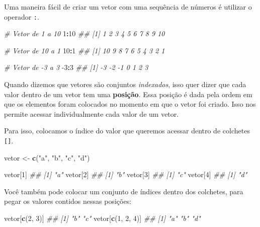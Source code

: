 \documentclass[]{book}
\newenvironment{Shaded}{\begin{snugshade}}{\end{snugshade}}
\newcommand{\CommentTok}[1]{\textcolor[rgb]{0.56,0.35,0.01}{\textit{#1}}}
\newcommand{\DecValTok}[1]{\textcolor[rgb]{0.00,0.00,0.81}{#1}}
\newcommand{\KeywordTok}[1]{\textcolor[rgb]{0.13,0.29,0.53}{\textbf{#1}}}
\newcommand{\NormalTok}[1]{#1}
\newcommand{\OperatorTok}[1]{\textcolor[rgb]{0.81,0.36,0.00}{\textbf{#1}}}
\newcommand{\StringTok}[1]{\textcolor[rgb]{0.31,0.60,0.02}{#1}}
\begin{document}
Uma maneira fácil de criar um vetor com uma sequência de números é utilizar o operador \texttt{:}.

\begin{Shaded}
\begin{Highlighting}[]
\CommentTok{# Vetor de 1 a 10}
\DecValTok{1}\OperatorTok{:}\DecValTok{10}
\CommentTok{##  [1]  1  2  3  4  5  6  7  8  9 10}

\CommentTok{# Vetor de 10 a 1}
\DecValTok{10}\OperatorTok{:}\DecValTok{1}
\CommentTok{##  [1] 10  9  8  7  6  5  4  3  2  1}

\CommentTok{# Vetor de -3 a 3}
\DecValTok{-3}\OperatorTok{:}\DecValTok{3}
\CommentTok{## [1] -3 -2 -1  0  1  2  3}
\end{Highlighting}
\end{Shaded}

Quando dizemos que vetores são conjuntos \emph{indexados}, isso quer dizer que cada valor dentro de um vetor tem uma \textbf{posição}. Essa posição é dada pela ordem em que os elementos foram colocados no momento em que o vetor foi criado. Isso nos permite acessar individualmente cada valor de um vetor.

Para isso, colocamos o índice do valor que queremos acessar dentro de colchetes \texttt{{[}{]}}.

\begin{Shaded}
\begin{Highlighting}[]
\NormalTok{vetor <-}\StringTok{ }\KeywordTok{c}\NormalTok{(}\StringTok{"a"}\NormalTok{, }\StringTok{"b"}\NormalTok{, }\StringTok{"c"}\NormalTok{, }\StringTok{"d"}\NormalTok{)}

\NormalTok{vetor[}\DecValTok{1}\NormalTok{]}
\CommentTok{## [1] "a"}
\NormalTok{vetor[}\DecValTok{2}\NormalTok{]}
\CommentTok{## [1] "b"}
\NormalTok{vetor[}\DecValTok{3}\NormalTok{]}
\CommentTok{## [1] "c"}
\NormalTok{vetor[}\DecValTok{4}\NormalTok{]}
\CommentTok{## [1] "d"}
\end{Highlighting}
\end{Shaded}

Você também pode colocar um conjunto de índices dentro dos colchetes, para pegar os valores contidos nessas posições:

\begin{Shaded}
\begin{Highlighting}[]
\NormalTok{vetor[}\KeywordTok{c}\NormalTok{(}\DecValTok{2}\NormalTok{, }\DecValTok{3}\NormalTok{)]}
\CommentTok{## [1] "b" "c"}
\NormalTok{vetor[}\KeywordTok{c}\NormalTok{(}\DecValTok{1}\NormalTok{, }\DecValTok{2}\NormalTok{, }\DecValTok{4}\NormalTok{)]}
\CommentTok{## [1] "a" "b" "d"}
\end{Highlighting}
\end{Shaded}
\end{document}
